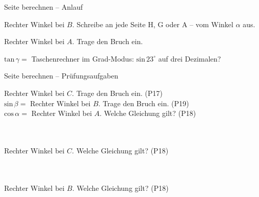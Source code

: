 \setcounter{aufgabe}{0}

\begin{aufgabe}{Seite berechnen – Anlauf}
\begin{teile}
\teil Rechter Winkel bei $B$. Schreibe an jede Seite H, G oder A – vom Winkel $\alpha$ aus.

\teil Rechter Winkel bei $A$. Trage den Bruch ein.

$\mathrm{tan}\,\gamma =$ \leerfeld
\teil Taschenrechner im Grad-Modus: $\mathrm{sin}\,23^\circ$ auf drei Dezimalen? \leerfeld
\end{teile}
\end{aufgabe}

\begin{aufgabe}{Seite berechnen – Prüfungsaufgaben}
\begin{teile}
\teil Rechter Winkel bei $C$. Trage den Bruch ein. \hfill (P17) \\

$\mathrm{sin}\,\beta =$ \leerfeld
\teil Rechter Winkel bei $B$. Trage den Bruch ein. \hfill (P19) \\

$\mathrm{cos}\,\alpha =$ \leerfeld
\teil Rechter Winkel bei $A$. Welche Gleichung gilt? \hfill (P18) \\  \\  \\ 

\teil Rechter Winkel bei $C$. Welche Gleichung gilt? \hfill (P18) \\  \\  \\ 

\teil Rechter Winkel bei $B$. Welche Gleichung gilt? \hfill (P18) \\  \\  \\ 

\end{teile}
\end{aufgabe}

